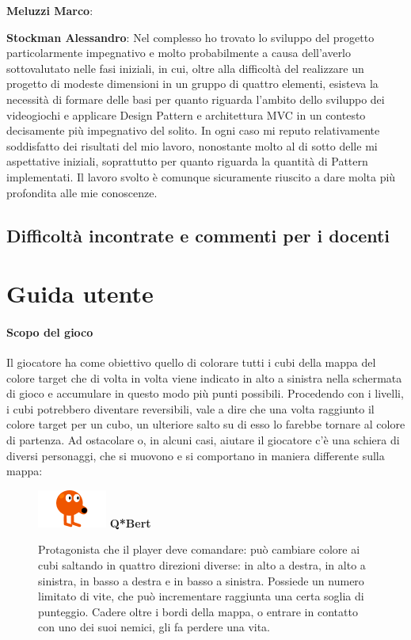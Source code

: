 \documentclass[a4paper,12pt, hidelinks]{report}
\begin{document}
	\item \textbf{Meluzzi Marco}:

	\item \textbf{Stockman Alessandro}: Nel complesso ho trovato lo sviluppo del progetto particolarmente impegnativo e molto probabilmente a causa dell'averlo sottovalutato nelle fasi iniziali, in cui, oltre alla difficoltà del realizzare un progetto di modeste dimensioni in un gruppo di quattro elementi, esisteva la necessità di formare delle basi per quanto riguarda l'ambito dello sviluppo dei videogiochi e applicare Design Pattern e architettura MVC in un contesto decisamente più impegnativo del solito.
	In ogni caso mi reputo relativamente soddisfatto dei risultati del mio lavoro, nonostante molto al di sotto delle mi aspettative iniziali, soprattutto per quanto riguarda la quantità di Pattern implementati. Il lavoro svolto è comunque sicuramente riuscito a dare molta più profondita alle mie conoscenze.

\section{Difficoltà incontrate e commenti per i docenti}


\appendix
\chapter{Guida utente}

\subsubsection{Scopo del gioco}

Il giocatore ha come obiettivo quello di colorare tutti i cubi della mappa del colore target che di volta in volta viene indicato in alto a sinistra nella schermata di gioco e accumulare in questo modo più punti possibili. Procedendo con i livelli, i cubi potrebbero diventare reversibili, vale a dire che una volta raggiunto il colore target per un cubo, un ulteriore salto su di esso lo farebbe tornare al colore di partenza. Ad ostacolare o, in alcuni casi, aiutare il giocatore c'è una schiera di diversi personaggi, che si muovono e si comportano in maniera differente sulla mappa:


\begin{figure}[H]
		\item
		\includegraphics[width=0.15\linewidth]{img/Qbert}
		\label{img:Q*Bert}
		\textbf{Q*Bert}

		Protagonista che il player deve comandare: può cambiare colore ai cubi saltando in quattro direzioni diverse: in alto a destra, in alto a sinistra, in basso a destra e in basso a sinistra. Possiede un numero limitato di vite, che può incrementare raggiunta una certa soglia di punteggio. Cadere oltre i bordi della mappa, o entrare in contatto con uno dei suoi nemici, gli fa perdere una vita.

\end{figure}
\end{document}

